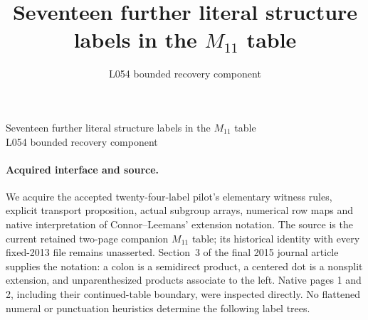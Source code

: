 \documentclass[10pt]{article}
\title{Seventeen further literal structure labels in the $M_{11}$ table}
\author{L054 bounded recovery component}
\date{}
\begin{document}
\begin{center}
{\Large Seventeen further literal structure labels in the $M_{11}$ table}\\[5pt]
L054 bounded recovery component
\end{center}
\paragraph{Acquired interface and source.}
We acquire the accepted twenty-four-label pilot's elementary witness rules,
explicit transport proposition, actual subgroup arrays, numerical row maps
and native interpretation of Connor--Leemans' extension notation. The source
is the current retained two-page companion $M_{11}$ table; its historical
identity with every fixed-2013 file remains unasserted. Section~3 of the final
2015 journal article supplies the notation: a colon is a semidirect product,
a centered dot is a nonsplit extension, and unparenthesized products associate
to the left. Native pages 1 and 2, including their continued-table boundary,
were inspected directly. No flattened numeral or punctuation heuristics
determine the following label trees.
\end{document}
